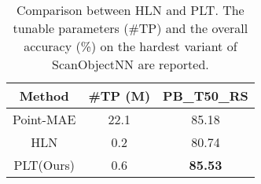 \begin{table}[!t]
\scriptsize
\setlength{\tabcolsep}{7.8mm}
\centering
\caption{Comparison between HLN and PLT. The tunable parameters (\#TP) and the overall accuracy (\%) on the hardest variant of ScanObjectNN are reported. }

\label{tab:sidenet}

\begin{tabular}{ccc}
\toprule
Method & \#TP (M) & PB\_T50\_RS \\
\midrule
Point-MAE & 22.1 & 85.18 \\
HLN & 0.2 & 80.74 \\
\rowcolor{linecolor!40} PLT(Ours) & 0.6 & \textbf{85.53} \\
\bottomrule
\end{tabular}
\end{table}
